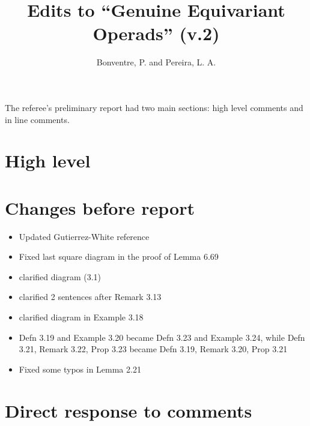 \documentclass{article}
\begin{document}
 
 
\title{Edits to ``Genuine Equivariant Operads'' (v.2)
\\[12pt]} %
 
\author{Bonventre, P. and Pereira, L. A.}
 
\maketitle
 
The referee's preliminary report had two main sections:
high level comments and in line comments.



\section{High level}


\section{Changes before report}

\begin{itemize}
\item Updated Gutierrez-White reference

\item Fixed last square diagram in the proof of Lemma 6.69

\item clarified diagram (3.1)

\item clarified 2 sentences after Remark 3.13

\item clarified diagram in Example 3.18

\item Defn 3.19 and Example 3.20 became Defn 3.23 and Example 3.24, while 
Defn 3.21, Remark 3.22, Prop 3.23 became Defn 3.19, Remark 3.20, Prop 3.21

\item Fixed some typos in Lemma 2.21
\end{itemize}

\section{Direct response to comments}
\end{document}
